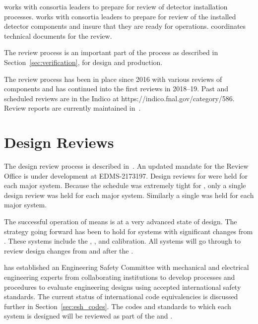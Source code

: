  works with consortia leaders to prepare for review of
detector installation processes.   works with consortia
leaders to prepare for review of the installed detector components and
insure that they are ready for operations.   coordinates
technical documents for the   review.

The review process is an important part of the  
process as described in Section~\ref{sec:verification}, for
design and production.

The review process has been in place since 2016 with various reviews
of  components and has continued into the first
 reviews in 2018--19. Past and scheduled reviews are in
the  Indico at https://indico.fnal.gov/category/586.
Review reports are currently maintained in~.

\section{Design Reviews}

The  design review process is described
in~. An updated mandate for the Review Office is under development
at EDMS-2173197\cite{bib:cernedms2173197}. Design reviews for  were held
for each major system. Because the schedule was extremely tight for
, only a single design review was held for each
major system. Similarly a single  was held for each major system.

The successful operation of  means  is at
a very advanced state of design. The strategy going forward has been to hold
 for systems with significant changes from
. These systems include the , ,
 and calibration. All systems will go through 
to review design changes from  and  after
the .

 has established an Engineering Safety Committee with
mechanical and electrical engineering experts from collaborating
institutions to develop processes and procedures to evaluate
engineering designs using accepted international safety standards. The
current status of international code equivalencies is discussed
further in Section~\ref{sec:esh_codes}. The codes and standards to
which each system is designed will be reviewed as part of the
 and .

